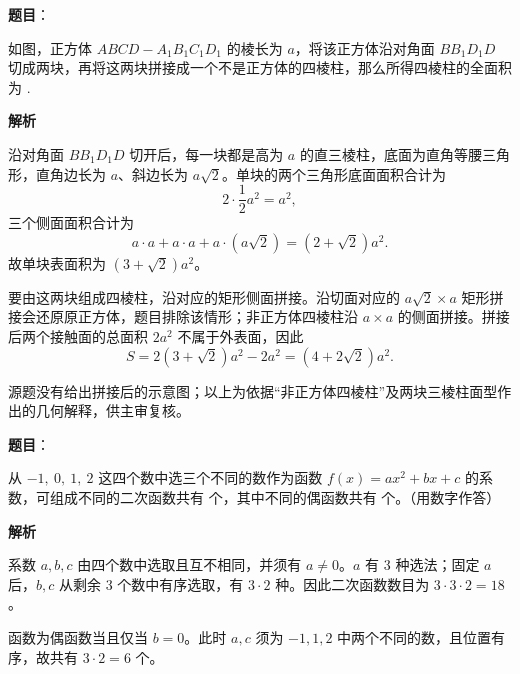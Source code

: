 \begin{answer}

\textbf{题目}：

如图，正方体 $ABCD-A_1B_1C_1D_1$ 的棱长为 $a$，将该正方体沿对角面 $BB_1D_1D$ 切成两块，再将这两块拼接成一个不是正方体的四棱柱，那么所得四棱柱的全面积为 \gkblank{}.
\nopagebreak[4]
\begin{center}\end{center}
\nopagebreak[4]
\textbf{解析}

沿对角面 $BB_1D_1D$ 切开后，每一块都是高为 $a$ 的直三棱柱，底面为直角等腰三角形，直角边长为 $a$、斜边长为 $a\sqrt2$。单块的两个三角形底面面积合计为
\nopagebreak[4]
\[2\cdot\frac12a^2=a^2,\]
三个侧面面积合计为
\nopagebreak[4]
\[a\cdot a+a\cdot a+a\cdot(a\sqrt2)=(2+\sqrt2)a^2.\]
故单块表面积为 $(3+\sqrt2)a^2$。

要由这两块组成四棱柱，沿对应的矩形侧面拼接。沿切面对应的 $a\sqrt2\times a$ 矩形拼接会还原原正方体，题目排除该情形；非正方体四棱柱沿 $a\times a$ 的侧面拼接。拼接后两个接触面的总面积 $2a^2$ 不属于外表面，因此
\nopagebreak[4]
\[S=2(3+\sqrt2)a^2-2a^2=(4+2\sqrt2)a^2.\]

源题没有给出拼接后的示意图；以上为依据“非正方体四棱柱”及两块三棱柱面型作出的几何解释，供主审复核。


\end{answer}
\begin{answer}

\textbf{题目}：

从 $-1,\ 0,\ 1,\ 2$ 这四个数中选三个不同的数作为函数 $f(x)=ax^2+bx+c$ 的系数，可组成不同的二次函数共有 \gkblank{} 个，其中不同的偶函数共有 \gkblank{} 个。（用数字作答）

\textbf{解析}

系数 $a,b,c$ 由四个数中选取且互不相同，并须有 $a\ne0$。$a$ 有 3 种选法；固定 $a$ 后，$b,c$ 从剩余 3 个数中有序选取，有 $3\cdot2$ 种。因此二次函数数目为 $3\cdot3\cdot2=18$。

函数为偶函数当且仅当 $b=0$。此时 $a,c$ 须为 $-1,1,2$ 中两个不同的数，且位置有序，故共有 $3\cdot2=6$ 个。


\end{answer}
